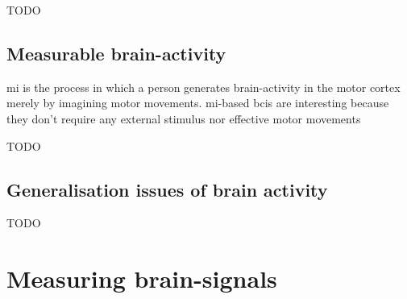 TODO


\subsection{Measurable brain-activity}
\label{subsec:biomedical_signals_brain_signals_measurable_brain_activity}


\Gls{mi} is the process in which a person generates brain-activity in the motor cortex merely by imagining motor movements.
\Gls{mi}-based \glspl{bci} are interesting because they don't require any external stimulus nor effective motor movements

TODO


\subsection{Generalisation issues of brain activity}
\label{subsec:biomedical_signals_brain_signals_generalisation}



TODO


\section{Measuring brain-signals}
\label{sec:biomedical_signals_measuring}




